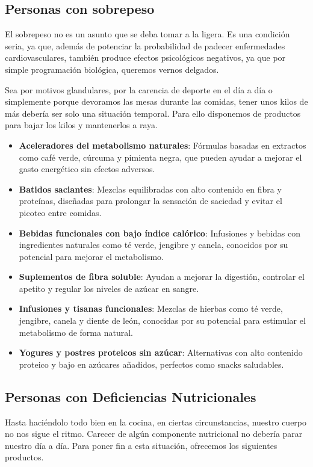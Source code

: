 \documentclass[11pt,a4paper]{report}
\begin{document}
\subsection{Personas con sobrepeso}
El sobrepeso no es un asunto que se deba tomar a la ligera. Es una condición seria, ya que, además de potenciar la probabilidad de padecer enfermedades cardiovasculares, también produce efectos psicológicos negativos, ya que por simple programación biológica, queremos vernos delgados.

Sea por motivos glandulares, por la carencia de deporte en el día a día o simplemente porque devoramos las mesas durante las comidas, tener unos kilos de más debería ser solo una situación temporal. Para ello disponemos de productos para bajar los kilos y mantenerlos a raya.

\begin{itemize}
    \item \textbf{Aceleradores del metabolismo naturales}: Fórmulas basadas en extractos como café verde, cúrcuma y pimienta negra, que pueden ayudar a mejorar el gasto energético sin efectos adversos.
    \item \textbf{Batidos saciantes}: Mezclas equilibradas con alto contenido en fibra y proteínas, diseñadas para prolongar la sensación de saciedad y evitar el picoteo entre comidas.
    \item \textbf{Bebidas funcionales con bajo índice calórico}: Infusiones y bebidas con ingredientes naturales como té verde, jengibre y canela, conocidos por su potencial para mejorar el metabolismo.
    \item \textbf{Suplementos de fibra soluble}: Ayudan a mejorar la digestión, controlar el apetito y regular los niveles de azúcar en sangre.
    \item \textbf{Infusiones y tisanas funcionales}: Mezclas de hierbas como té verde, jengibre, canela y diente de león, conocidas por su potencial para estimular el metabolismo de forma natural.
    \item \textbf{Yogures y postres proteicos sin azúcar}: Alternativas con alto contenido proteico y bajo en azúcares añadidos, perfectos como snacks saludables.
\end{itemize}


\subsection{Personas con Deficiencias Nutricionales}
Hasta haciéndolo todo bien en la cocina, en ciertas circunstancias, nuestro cuerpo no nos sigue el ritmo. Carecer de algún componente nutricional no debería parar nuestro día a día. Para poner fin a esta situación, ofrecemos los siguientes productos.
\end{document}
